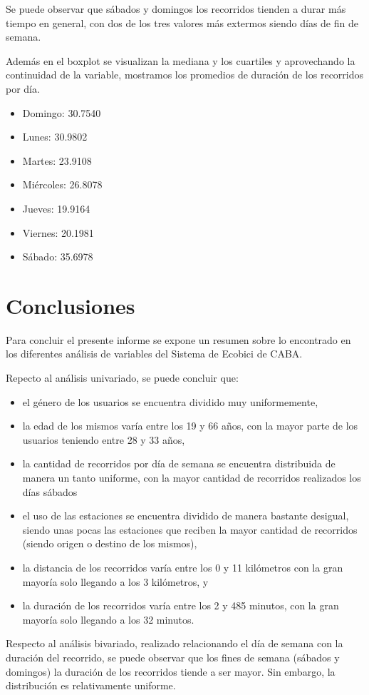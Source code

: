 \documentclass[11pt]{article}
\begin{document}
    Se puede observar que s\'abados y domingos los recorridos tienden a durar m\'as tiempo en general, con dos de los tres valores m\'as extermos siendo d\'ias de fin de semana. %

    Adem\'as en el boxplot se visualizan la mediana y los cuartiles y aprovechando la continuidad de la variable, mostramos los promedios de duraci\'on de los recorridos por d\'ia.

    \begin{itemize}
      \item Domingo: 30.7540
      \item Lunes: 30.9802
      \item Martes: 23.9108
      \item Mi\'ercoles: 26.8078
      \item Jueves: 19.9164
      \item Viernes: 20.1981
      \item S\'abado: 35.6978
    \end{itemize}

    \section{Conclusiones}
    Para concluir el presente informe se expone un resumen sobre lo encontrado en los diferentes an\'alisis de variables del Sistema de Ecobici de CABA.

    Repecto al an\'alisis univariado, se puede concluir que: 
    \begin{itemize}
      \item el g\'enero de los usuarios se encuentra dividido muy uniformemente, 
      \item la edad de los mismos var\'ia entre los 19 y 66 años, con la mayor parte de los usuarios teniendo entre 28 y 33 años,
      \item la cantidad de recorridos por d\'ia de semana se encuentra distribuida de manera un tanto uniforme, con la mayor cantidad de recorridos realizados los d\'ias s\'abados
      \item el uso de las estaciones se encuentra dividido de manera bastante desigual, siendo unas pocas las estaciones que reciben la mayor cantidad de recorridos (siendo origen o destino de los mismos),
      \item la distancia de los recorridos var\'ia entre los 0 y 11 kilómetros con la gran mayor\'ia solo llegando a los 3 kil\'ometros, y
      \item la duraci\'on de los recorridos var\'ia entre los 2 y 485 minutos, con la gran mayor\'ia solo llegando a los 32 minutos.
    \end{itemize}
      
    Respecto al an\'alisis bivariado, realizado relacionando el d\'ia de semana con la duraci\'on del recorrido, se puede observar que los fines de semana (s\'abados y domingos) la duraci\'on de los recorridos tiende a ser mayor. Sin embargo, la distribuci\'on es relativamente uniforme.
\end{document}
